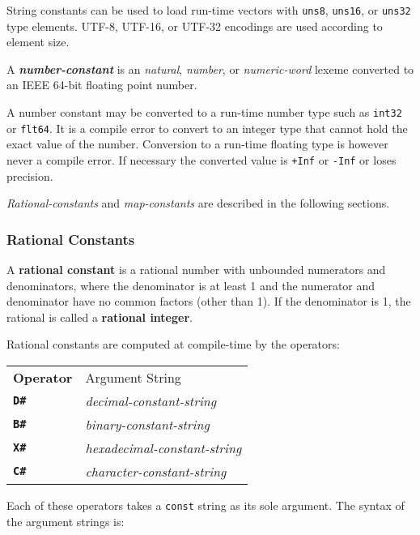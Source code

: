 \documentclass[12pt]{article}
\newcommand{\TT}[1]{{\tt \bfseries #1}}
\newcommand{\key}[1]{{\rm \bfseries #1}}
\newcommand{\emkey}[1]{{\em \bfseries #1}}
\begin{document}
String constants can be used to load run-time vectors
with {\tt uns8}, {\tt uns16}, or {\tt uns32} type elements.
UTF-8, UTF-16, or UTF-32 encodings are used according to element
size.

A \emkey{number-constant}\label{NUMBER-CONSTANT}
is an {\em natural}, {\em number},
or {\em numeric-word} lexeme converted to an IEEE 64-bit floating
point number.

A number constant may be converted to a run-time
number type such as {\tt int32} or {\tt flt64}.
It is a compile error to convert to an integer type that cannot
hold the exact value of the number.
Conversion to a run-time floating type is however
never a compile error.  If necessary the converted value is
{\tt +Inf} or {\tt -Inf} or loses precision.

{\em Rational-constants} and {\em map-constants} are described in the
following sections.


\subsubsection{Rational Constants}
\label{RATIONAL-CONSTANTS}

A \key{rational constant} is a rational number with unbounded
numerators and denominators, where the
denominator is at least 1 and the numerator and denominator
have no common factors (other than 1).  If the denominator is 1, the
rational is called a \key{rational integer}.

Rational constants are computed at compile-time by the operators:
\begin{center}
\begin{tabular}{ll}
\bf Operator	& Argument String
\\[1ex]
\TT{D\#}	& {\em decimal-constant-string} \\
\TT{B\#}	& {\em binary-constant-string} \\
\TT{X\#}	& {\em hexadecimal-constant-string} \\
\TT{C\#}	& {\em character-constant-string} \\
\end{tabular}
\end{center}

Each of these operators takes a {\tt const} string as its sole argument.
The syntax of the argument strings is:
\end{document}

